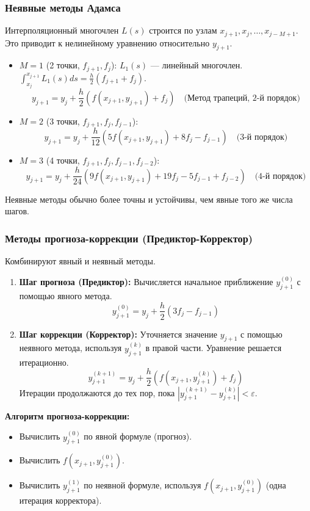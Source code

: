 \subsubsection{Неявные методы Адамса}
Интерполяционный многочлен $L(s)$ строится по узлам $x_{j+1}, x_j, \dots, x_{j-M+1}$. Это приводит к нелинейному уравнению относительно $y_{j+1}$.
\begin{itemize}
    \item $M=1$ (2 точки, $f_{j+1}, f_j$):
    $L_1(s)$ --- линейный многочлен. $\int_{x_j}^{x_{j+1}} L_1(s) ds = \frac{h}{2}(f_{j+1} + f_j)$.
    \[ y_{j+1} = y_j + \frac{h}{2} (f(x_{j+1}, y_{j+1}) + f_j) \quad \text{(Метод трапеций, 2-й порядок)} \]
    \item $M=2$ (3 точки, $f_{j+1}, f_j, f_{j-1}$):
    \[ y_{j+1} = y_j + \frac{h}{12} (5f(x_{j+1}, y_{j+1}) + 8f_j - f_{j-1}) \quad \text{(3-й порядок)} \]
    \item $M=3$ (4 точки, $f_{j+1}, f_j, f_{j-1}, f_{j-2}$):
    \[ y_{j+1} = y_j + \frac{h}{24} (9f(x_{j+1}, y_{j+1}) + 19f_j - 5f_{j-1} + f_{j-2}) \quad \text{(4-й порядок)} \]
\end{itemize}
Неявные методы обычно более точны и устойчивы, чем явные того же числа шагов.

\subsubsection{Методы прогноза-коррекции (Предиктор-Корректор)}
Комбинируют явный и неявный методы.
\begin{enumerate}
    \item \textbf{Шаг прогноза (Предиктор):} Вычисляется начальное приближение $y_{j+1}^{(0)}$ с помощью явного метода.
    \[ y_{j+1}^{(0)} = y_j + \frac{h}{2} (3f_j - f_{j-1}) \]
    \item \textbf{Шаг коррекции (Корректор):} Уточняется значение $y_{j+1}$ с помощью неявного метода, используя $y_{j+1}^{(k)}$ в правой части. Уравнение решается итерационно.
    \[ y_{j+1}^{(k+1)} = y_j + \frac{h}{2} (f(x_{j+1}, y_{j+1}^{(k)}) + f_j) \]
    Итерации продолжаются до тех пор, пока $|y_{j+1}^{(k+1)} - y_{j+1}^{(k)}| < \varepsilon$.
\end{enumerate}
\textbf{Алгоритм прогноза-коррекции:}
\begin{itemize}
    \item Вычислить $y_{j+1}^{(0)}$ по явной формуле (прогноз).
    \item Вычислить $f(x_{j+1}, y_{j+1}^{(0)})$.
    \item Вычислить $y_{j+1}^{(1)}$ по неявной формуле, используя $f(x_{j+1}, y_{j+1}^{(0)})$ (одна итерация корректора).
\end{itemize}


